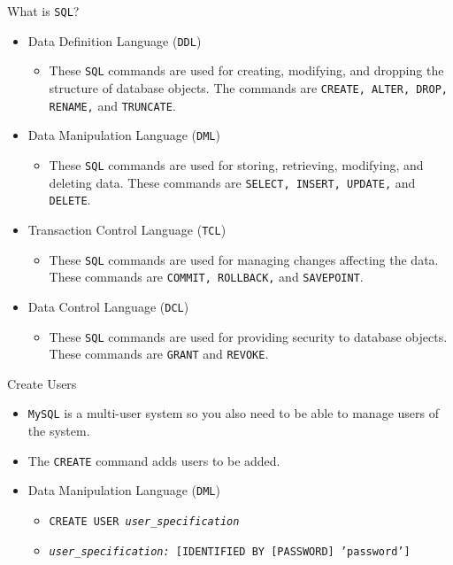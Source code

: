 \documentclass[xcolor=table]{beamer}
\begin{document}
\begin{frame}{What is \texttt{SQL}?}
  \begin{itemize}
    \item Data Definition Language (\texttt{DDL})
      \begin{itemize}
        \item These \texttt{SQL} commands are used for creating, modifying, and dropping the structure of database objects. The commands are \texttt{CREATE, ALTER, DROP, RENAME,} and \texttt{TRUNCATE}.
      \end{itemize}
    \item Data Manipulation Language (\texttt{DML})
      \begin{itemize}
        \item These \texttt{SQL} commands are used for storing, retrieving, modifying, and deleting data. These commands are \texttt{SELECT, INSERT, UPDATE,} and \texttt{DELETE}.
      \end{itemize}
    \item Transaction Control Language (\texttt{TCL})
      \begin{itemize}
        \item These \texttt{SQL} commands are used for managing changes affecting the data. These commands are \texttt{COMMIT, ROLLBACK,} and \texttt{SAVEPOINT}.
      \end{itemize}
    \item Data Control Language (\texttt{DCL})
      \begin{itemize}
        \item These \texttt{SQL} commands are used for providing security to database objects. These commands are \texttt{GRANT} and \texttt{REVOKE}.
      \end{itemize}
  \end{itemize}
\end{frame}

\begin{frame}{Create Users}
  \begin{itemize}
    \item \texttt{MySQL} is a multi-user system so you also need to be able to manage users of the system.
    \item The \texttt{CREATE} command adds users to be added.
    \item Data Manipulation Language (\texttt{DML})
      \begin{itemize}
        \item \texttt{CREATE USER \textit{user\_specification}}
        \item \texttt{\textit{user\_specification:} [IDENTIFIED BY [PASSWORD] 'password']} 
      \end{itemize}
  \end{itemize}
\end{frame}
\end{document}
